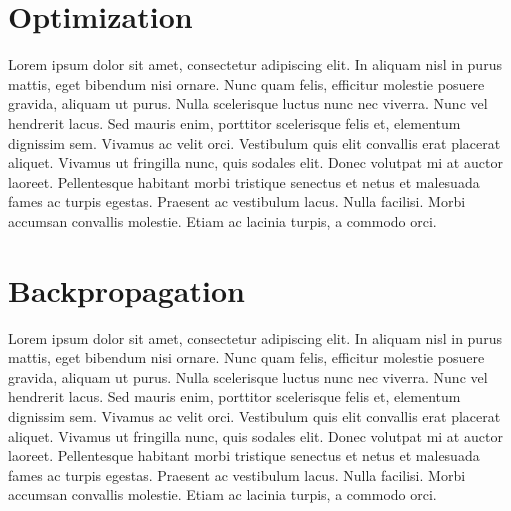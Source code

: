 \section{Optimization}\label{sec:3.5}
\vspace{-0.5cm}
\noindent Lorem ipsum dolor sit amet, consectetur adipiscing elit. In aliquam nisl in purus mattis, eget bibendum nisi ornare. Nunc quam felis, efficitur molestie posuere gravida, aliquam ut purus. Nulla scelerisque luctus nunc nec viverra. Nunc vel hendrerit lacus. Sed mauris enim, porttitor scelerisque felis et, elementum dignissim sem. Vivamus ac velit orci. Vestibulum quis elit convallis erat placerat aliquet. Vivamus ut fringilla nunc, quis sodales elit. Donec volutpat mi at auctor laoreet. Pellentesque habitant morbi tristique senectus et netus et malesuada fames ac turpis egestas. Praesent ac vestibulum lacus. Nulla facilisi. Morbi accumsan convallis molestie. Etiam ac lacinia turpis, a commodo orci.

\vspace{-0.3cm}





\section{Backpropagation}\label{sec:3.6}
\vspace{-0.5cm}
\noindent Lorem ipsum dolor sit amet, consectetur adipiscing elit. In aliquam nisl in purus mattis, eget bibendum nisi ornare. Nunc quam felis, efficitur molestie posuere gravida, aliquam ut purus. Nulla scelerisque luctus nunc nec viverra. Nunc vel hendrerit lacus. Sed mauris enim, porttitor scelerisque felis et, elementum dignissim sem. Vivamus ac velit orci. Vestibulum quis elit convallis erat placerat aliquet. Vivamus ut fringilla nunc, quis sodales elit. Donec volutpat mi at auctor laoreet. Pellentesque habitant morbi tristique senectus et netus et malesuada fames ac turpis egestas. Praesent ac vestibulum lacus. Nulla facilisi. Morbi accumsan convallis molestie. Etiam ac lacinia turpis, a commodo orci.

\vspace{-0.3cm}




